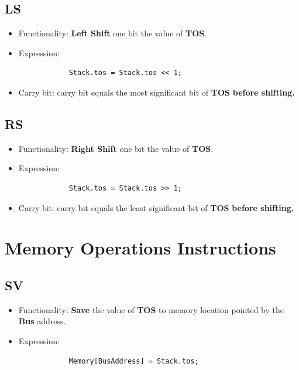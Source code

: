 \documentclass[11pt]{report}
\begin{document}
    \subsection{LS}
    \label{subsection:ls}
    \begin{itemize}
        \item Functionality: \textbf{Left Shift} one bit the value of \textbf{TOS}.
        \item Expression:
        \begin{verbatim}
            Stack.tos = Stack.tos << 1;
        \end{verbatim}
        \item Carry bit: carry bit equals the most significant bit of \textbf{TOS} \textbf{before shifting.} 
    \end{itemize}

    \subsection{RS}
    \label{subsection:rs}
    \begin{itemize}
        \item Functionality: \textbf{Right Shift} one bit the value of \textbf{TOS}.
        \item Expression:
        \begin{verbatim}
            Stack.tos = Stack.tos >> 1;
        \end{verbatim}
        \item Carry bit: carry bit equals the least significant bit of \textbf{TOS} \textbf{before shifting.} 
    \end{itemize}

    \section{Memory Operations Instructions}
    \subsection{SV}
    \begin{itemize}
        \item Functionality: \textbf{Save} the value of \textbf{TOS} to memory location 
                pointed by the \textbf{Bus} address.
        \item Expression:
        \begin{verbatim}
            Memory[BusAddress] = Stack.tos;
        \end{verbatim}
    \end{itemize}
\end{document}
